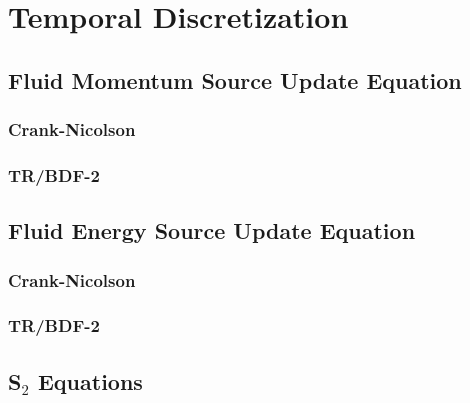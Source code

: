 \section{Temporal Discretization}
\subsection{Fluid Momentum Source Update Equation}
\subsubsection{Crank-Nicolson}

\subsubsection{TR/BDF-2}

\subsection{Fluid Energy Source Update Equation}
\subsubsection{Crank-Nicolson}

\subsubsection{TR/BDF-2}

\subsection{\texorpdfstring{S$_2$}{S-2} Equations}
